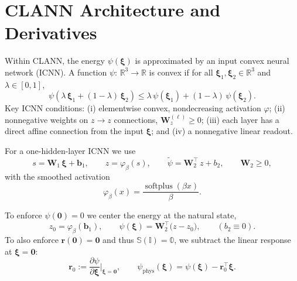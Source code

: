 \documentclass[journal,article,submit,pdftex,moreauthors]{Definitions/mdpi}
\newcommand{\vect}[1]{\boldsymbol{#1}}
\begin{document}
\section{CLANN Architecture and Derivatives}
Within CLANN, the energy $\psi(\vect{\xi})$ is approximated by an input convex neural network (ICNN). A function $\psi:\,\mathbb R^3\to\mathbb R$ is convex if for all $\vect{\xi}_1,\vect{\xi}_2\in\mathbb R^3$ and $\lambda\in[0,1]$,
\begin{equation}
\psi(\lambda \,\vect{\xi}_1 + (1-\lambda) \,\vect{\xi}_2) \le \lambda\,\psi(\vect{\xi}_1) + (1-\lambda)\,\psi(\vect{\xi}_2).
\label{eq:convexity_definition_eng}
\end{equation}
Key ICNN conditions: (i) elementwise convex, nondecreasing activation $\varphi$; (ii) nonnegative weights on $z\to z$ connections, $\mathbf W_z^{(\ell)}\ge 0$; (iii) each layer has a direct affine connection from the input $\boldsymbol{\xi}$; and (iv) a nonnegative linear readout.

For a one-hidden-layer ICNN we use
\begin{equation}
  s = \mathbf W_1 \, \boldsymbol{\xi} + \mathbf b_1,\qquad
  z = \varphi_{\beta}(s),\qquad
  \tilde{\psi} = \mathbf W_2^{\top} \, z + b_2,\qquad \mathbf W_2 \ge 0,
  \label{eq:icnn_onelayer_eng}
\end{equation}
with the smoothed activation
\begin{equation}
  \varphi_{\beta}(x) = \frac{\operatorname{softplus}(\beta x)}{\beta}.
  \label{eq:softplus_activation_eng}
\end{equation}

To enforce $\psi(\mathbf 0)=0$ we center the energy at the natural state,
\begin{equation}
  z_0 = \varphi_{\beta}(\mathbf b_1),\qquad
  \psi(\boldsymbol{\xi}) = \mathbf W_2^{\top}\big(z - z_0\big),\qquad (b_2 \equiv 0).
  \label{eq:center_psi_eng}
\end{equation}
To also enforce $\vect r(\mathbf 0)=\mathbf 0$ and thus $\mathbb S(\mathbb I)=\mathbb 0$, we subtract the linear response at $\boldsymbol{\xi}=\mathbf 0$:
\begin{equation}
  \mathbf r_0 := \frac{\partial \psi}{\partial \boldsymbol{\xi}}\bigg|_{\boldsymbol{\xi}=\mathbf 0},\qquad
  \psi_{\mathrm{phys}}(\boldsymbol{\xi}) = \psi(\boldsymbol{\xi}) - \mathbf r_0^{\top}\boldsymbol{\xi}.
  \label{eq:phys_energy_eng}
\end{equation}
\end{document}
